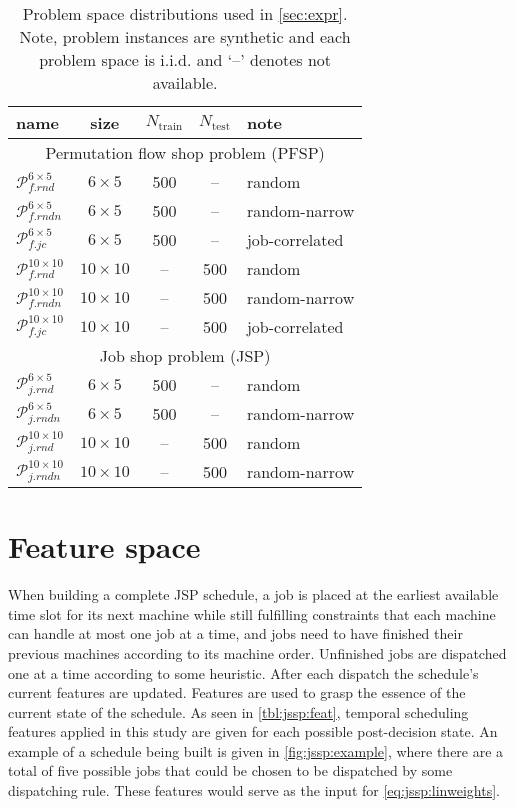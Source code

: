 \documentclass[graybox]{svmult}
\begin{document}
\begin{table}\centering
\caption{Problem space distributions used in \cref{sec:expr}. Note, problem 
instances are synthetic and each problem space is i.i.d. and `--' denotes not 
available.}\label{tbl:data:sim}
{\renewcommand{\arraystretch}{1.5}
\begin{tabular}{l|c|c|c|l}\toprule
name&size & $N_{\text{train}}$&$N_{\text{test}}$  & note 
\\  \midrule
\multicolumn{5}{c}{Permutation flow shop problem (PFSP)} \\ \midrule
$\mathcal{P}_{f.rnd}^{6\times5}$ &$6\times5$& 500&--& random \\ 
$\mathcal{P}_{f.rndn}^{6\times5}$&$6\times5$& 500&--& random-narrow \\ 
$\mathcal{P}_{f.jc}^{6\times5}$  &$6\times5$& 500&--& job-correlated \\ 
$\mathcal{P}_{f.rnd}^{10\times10}$ &$10\times10$&--&500&random \\ 
$\mathcal{P}_{f.rndn}^{10\times10}$&$10\times10$&--&500& random-narrow \\ 
$\mathcal{P}_{f.jc}^{10\times10}$  &$10\times10$&--&500& job-correlated \\ 
\midrule
\multicolumn{5}{c}{Job shop problem (JSP)} \\ \midrule
$\mathcal{P}_{j.rnd}^{6\times5}$ & $6\times5$ & 500 & -- & random \\
$\mathcal{P}_{j.rndn}^{6\times5}$ & $6\times5$ & 500 & -- & random-narrow \\
$\mathcal{P}_{j.rnd}^{10\times10}$ &$10\times10$& -- & 500 & random \\
$\mathcal{P}_{j.rndn}^{10\times10}$ &$10\times10$& -- & 500 & random-narrow \\ 
\bottomrule
\end{tabular}
}
\end{table}

\section{Feature space}\label{sec:feat}
When building a complete JSP schedule, a job is placed at the earliest 
available time slot for its next machine while still fulfilling constraints 
that each machine can handle at most one job at a time, and jobs need to have 
finished their previous machines according to its machine order. 
Unfinished jobs are dispatched one at a time according to some heuristic. After 
each dispatch the schedule's current features are updated.
Features are used to grasp the essence of the current state of the schedule. As 
seen in \cref{tbl:jssp:feat}, temporal scheduling features applied in this 
study are given for each possible post-decision state. An example of a schedule 
being built is given in \cref{fig:jssp:example}, where there are a total of 
five possible jobs that could be chosen to be dispatched by some dispatching 
rule. These features would serve as the input for \cref{eq:jssp:linweights}. 
\end{document}
